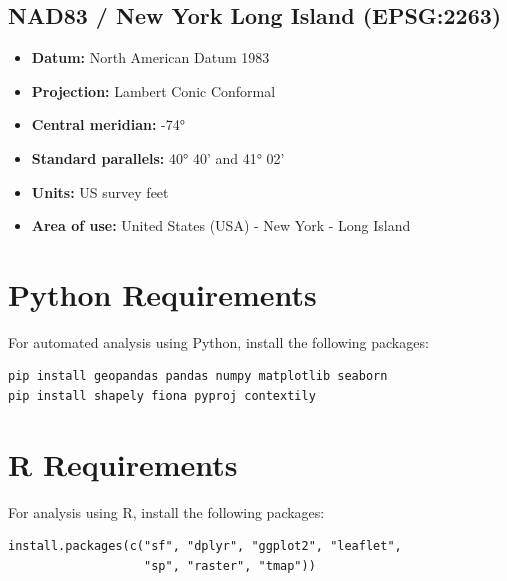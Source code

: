 \documentclass[11pt,letterpaper]{article}
\begin{document}
\subsection{NAD83 / New York Long Island (EPSG:2263)}
\begin{itemize}
    \item \textbf{Datum:} North American Datum 1983
    \item \textbf{Projection:} Lambert Conic Conformal
    \item \textbf{Central meridian:} -74°
    \item \textbf{Standard parallels:} 40° 40' and 41° 02'
    \item \textbf{Units:} US survey feet
    \item \textbf{Area of use:} United States (USA) - New York - Long Island
\end{itemize}

\section{Python Requirements}

For automated analysis using Python, install the following packages:

\begin{verbatim}
pip install geopandas pandas numpy matplotlib seaborn
pip install shapely fiona pyproj contextily
\end{verbatim}

\section{R Requirements}

For analysis using R, install the following packages:

\begin{verbatim}
install.packages(c("sf", "dplyr", "ggplot2", "leaflet",
                   "sp", "raster", "tmap"))
\end{verbatim}
\end{document}
